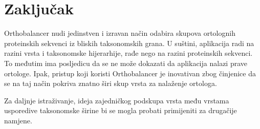 \chapter{Zaključak}
\label{chap:zakljucak}

Orthobalancer nudi jedinstven i izravan način odabira skupova ortolognih
proteinskih sekvenci iz bliskih taksonomskih grana. U suštini, aplikacija radi
na razini vrsta i taksonomske hijerarhije, rađe nego na razini proteinskih
sekvenci. To međutim ima posljedicu da se ne može dokazati da aplikacija nalazi
prave ortologe. Ipak, pristup koji koristi Orthobalancer je inovativan zbog
činjenice da se na taj način pokriva znatno širi skup vrsta za nalaženje
ortologa.

Za daljnje istraživanje, ideja zajedničkog podskupa vrsta među vrstama
usporedive taksonomske širine bi se mogla probati primijeniti za drugačije
namjene.
